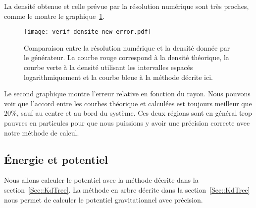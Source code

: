 			La densité obtenue et celle prévue par la résolution numérique sont très proches,
			comme le montre le graphique~\ref{Comp_gene-theo}.
			\begin{figure}[htbp]
				\centering \texttt{[image: verif\_densite\_new\_error.pdf]}
				\caption{Comparaison entre la résolution numérique et la densité donnée par le
				générateur\label{Comp_gene-theo}. La courbe rouge correspond à la densité théorique, la
				courbe verte à la densité utilisant les intervalles espacés logarithmiquement et la courbe bleue
				à la méthode décrite ici.}
			\end{figure}
			Le second graphique montre l'erreur relative en fonction du rayon. Nous
			pouvons voir que l'accord entre les courbes théorique et calculées est toujours meilleur que $20\%$, sauf au centre et au bord
			du système. Ces deux régions sont en général trop pauvres en particules pour que nous puissions y avoir une précision correcte
			avec notre méthode de calcul.

		\subsection{Énergie et potentiel}

			Nous allons calculer le potentiel avec la méthode décrite dans la section~\ref{Sec::KdTree}.
			La méthode en arbre décrite dans la section~\ref{Sec::KdTree} nous permet de calculer le potentiel gravitationnel avec
			précision.

